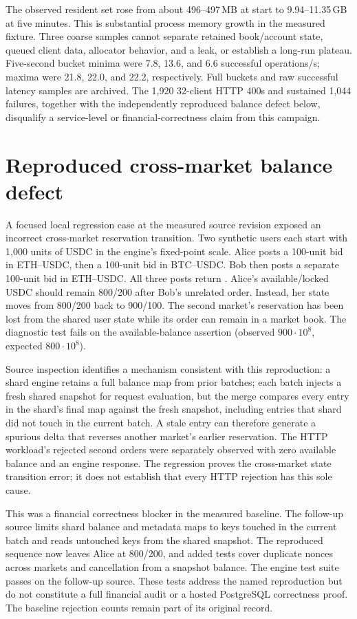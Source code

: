 \documentclass[envcountsame,runningheads,notitlepage]{llncs}
\newcommand{\pathref}[1]{\texttt{\detokenize{#1}}}
\begin{document}
The observed resident set rose from about 496--497\,MB at start to 9.94--11.35\,GB at five minutes. This is substantial process memory growth in the measured fixture. Three coarse samples cannot separate retained book/account state, queued client data, allocator behavior, and a leak, or establish a long-run plateau. Five-second bucket minima were 7.8, 13.6, and 6.6 successful operations/s; maxima were 21.8, 22.0, and 22.2, respectively. Full buckets and raw successful latency samples are archived. The 1,920 32-client HTTP 400s and sustained 1,044 failures, together with the independently reproduced balance defect below, disqualify a service-level or financial-correctness claim from this campaign.

\section{Reproduced cross-market balance defect}\label{sec:balance-defect}
A focused local regression case at the measured source revision exposed an incorrect cross-market reservation transition. Two synthetic users each start with 1,000 units of USDC in the engine's fixed-point scale. Alice posts a 100-unit bid in ETH--USDC, then a 100-unit bid in BTC--USDC. Bob then posts a separate 100-unit bid in ETH--USDC. All three posts return \pathref{OrderPosted}. Alice's available/locked USDC should remain 800/200 after Bob's unrelated order. Instead, her state moves from 800/200 back to 900/100. The second market's reservation has been lost from the shared user state while its order can remain in a market book. The diagnostic test fails on the available-balance assertion (observed $900\cdot10^8$, expected $800\cdot10^8$).\cite{source}

Source inspection identifies a mechanism consistent with this reproduction: a shard engine retains a full balance map from prior batches; each batch injects a fresh shared snapshot for request evaluation, but the merge compares every entry in the shard's final map against the fresh snapshot, including entries that shard did not touch in the current batch. A stale entry can therefore generate a spurious delta that reverses another market's earlier reservation. The HTTP workload's rejected second orders were separately observed with zero available balance and an \pathref{InsufficientBalance} engine response. The regression proves the cross-market state transition error; it does not establish that every HTTP rejection has this sole cause.\cite{source}

This was a financial correctness blocker in the measured baseline. The follow-up source limits shard balance and metadata maps to keys touched in the current batch and reads untouched keys from the shared snapshot. The reproduced sequence now leaves Alice at 800/200, and added tests cover duplicate nonces across markets and cancellation from a snapshot balance. The engine test suite passes on the follow-up source. These tests address the named reproduction but do not constitute a full financial audit or a hosted PostgreSQL correctness proof. The baseline rejection counts remain part of its original record.\cite{source}
\end{document}
